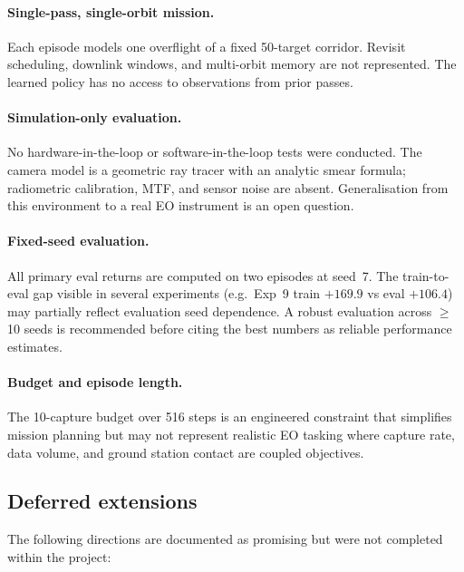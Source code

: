 \paragraph{Single-pass, single-orbit mission.}
Each episode models one overflight of a fixed 50-target corridor.
Revisit scheduling, downlink windows, and multi-orbit memory are not represented.
The learned policy has no access to observations from prior passes.

\paragraph{Simulation-only evaluation.}
No hardware-in-the-loop or software-in-the-loop tests were conducted.
The camera model is a geometric ray tracer with an analytic smear formula; radiometric calibration,
MTF, and sensor noise are absent.
Generalisation from this environment to a real EO instrument is an open question.

\paragraph{Fixed-seed evaluation.}
All primary eval returns are computed on two episodes at seed~7.
The train-to-eval gap visible in several experiments (e.g.\ Exp~9 train $+169.9$ vs eval $+106.4$)
may partially reflect evaluation seed dependence.
A robust evaluation across $\ge$10 seeds is recommended before citing the best numbers as
reliable performance estimates.

\paragraph{Budget and episode length.}
The 10-capture budget over 516 steps is an engineered constraint that simplifies mission planning
but may not represent realistic EO tasking where capture rate, data volume, and ground station contact
are coupled objectives.

\subsection{Deferred extensions}
\label{sec:discussion-deferred}

The following directions are documented as promising but were not completed within the project:

